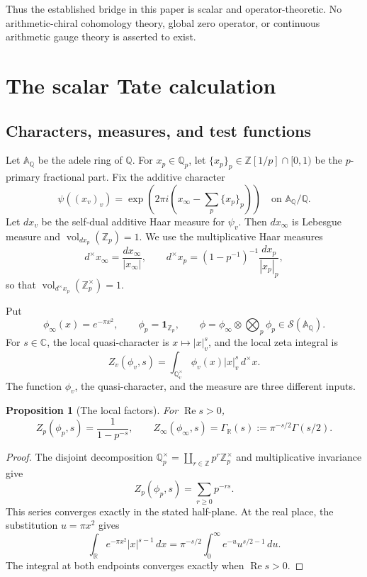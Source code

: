 \documentclass[11pt]{article}
\theoremstyle{plain}
\newtheorem{proposition}[theorem]{Proposition}
\theoremstyle{definition}
\theoremstyle{remark}
\newcommand{\GammaR}{\Gamma_{\mathbb R}}
\newcommand{\Adele}{\mathbb A_{\mathbb Q}}
\newcommand{\one}{\mathbf 1}
\begin{document}
Thus the established bridge in this paper is scalar and operator-theoretic.
No arithmetic-chiral cohomology theory, global zero operator, or continuous
arithmetic gauge theory is asserted to exist.

\section{The scalar Tate calculation}

\subsection{Characters, measures, and test functions}

Let \(\Adele\) be the adele ring of \(\mathbb Q\).  For
\(x_p\in\mathbb Q_p\), let \(\{x_p\}_p\in\mathbb Z[1/p]\cap[0,1)\) be the
\(p\)-primary fractional part.  Fix the additive character
\[
 \psi((x_v)_v)
 =\exp\!\left(2\pi i\left(x_\infty-\sum_p\{x_p\}_p\right)\right)
 \quad\text{on }\Adele/\mathbb Q.
\]
Let \(dx_v\) be the self-dual additive Haar measure for \(\psi_v\).
Then \(dx_\infty\) is Lebesgue measure and
\(\operatorname{vol}_{dx_p}(\mathbb Z_p)=1\).  We use the multiplicative
Haar measures
\[
 d^\times x_\infty=\frac{dx_\infty}{|x_\infty|},
 \qquad
 d^\times x_p=(1-p^{-1})^{-1}\frac{dx_p}{|x_p|_p},
\]
so that \(\operatorname{vol}_{d^\times x_p}(\mathbb Z_p^\times)=1\).

Put
\[
 \phi_\infty(x)=e^{-\pi x^2},\qquad
 \phi_p=\one_{\mathbb Z_p},\qquad
 \phi=\phi_\infty\otimes\bigotimes_p\phi_p\in\mathcal S(\Adele).
\]
For \(s\in\mathbb C\), the local quasi-character is
\(x\mapsto |x|_v^s\), and the local zeta integral is
\[
 Z_v(\phi_v,s)
 =\int_{\mathbb Q_v^\times}\phi_v(x)|x|_v^s\,d^\times x.
\]
The function \(\phi_v\), the quasi-character, and the measure are three
different inputs.

\begin{proposition}[The local factors]
\label{prop:local-tate}
For \(\operatorname{Re}s>0\),
\[
 Z_p(\phi_p,s)=\frac{1}{1-p^{-s}},
 \qquad
 Z_\infty(\phi_\infty,s)
 =\GammaR(s):=\pi^{-s/2}\Gamma(s/2).
\]
\end{proposition}

\begin{proof}
The disjoint decomposition
\(\mathbb Q_p^\times=\coprod_{r\in\mathbb Z}p^r\mathbb Z_p^\times\)
and multiplicative invariance give
\[
 Z_p(\phi_p,s)=\sum_{r\geq0}p^{-rs}.
\]
This series converges exactly in the stated half-plane.  At the real place,
the substitution \(u=\pi x^2\) gives
\[
 \int_{\mathbb R}e^{-\pi x^2}|x|^{s-1}\,dx
 =\pi^{-s/2}\int_0^\infty e^{-u}u^{s/2-1}\,du.
\]
The integral at both endpoints converges exactly when
\(\operatorname{Re}s>0\).
\end{proof}
\end{document}
